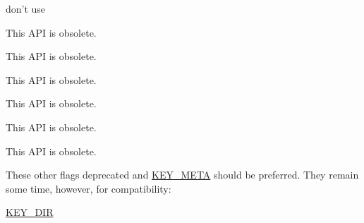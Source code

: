 
\begin{DoxyRefList}
\item[\label{deprecated__deprecated000001}%
\hypertarget{deprecated__deprecated000001}{}%
Global \hyperlink{group__keyset_gga98a3d6a4016c9dad9cbd1a99a9c2a45aad9d03b36ee88ca5a774cc01b190c99b8}{K\-D\-B\-\_\-\-O\-\_\-\-S\-O\-R\-T} ]don't use  
\item[\label{deprecated__deprecated000010}%
\hypertarget{deprecated__deprecated000010}{}%
Global \hyperlink{group__keymeta_ga6b05da399c3c78904969ef39f191b0eb}{key\-Get\-A\-Time} (const Key $\ast$key)]This A\-P\-I is obsolete. 
\item[\label{deprecated__deprecated000014}%
\hypertarget{deprecated__deprecated000014}{}%
Global \hyperlink{group__keymeta_ga2c213c120cbe02201278ef7fb8cd94be}{key\-Get\-C\-Time} (const Key $\ast$key)]This A\-P\-I is obsolete. 
\item[\label{deprecated__deprecated000005}%
\hypertarget{deprecated__deprecated000005}{}%
Global \hyperlink{group__keymeta_ga46a95e81d7d7f4e3eb59e60e5f3738c0}{key\-Get\-G\-I\-D} (const Key $\ast$key)]This A\-P\-I is obsolete. 
\item[\label{deprecated__deprecated000008}%
\hypertarget{deprecated__deprecated000008}{}%
Global \hyperlink{group__keymeta_gabc0cec592ce3b77e9bc33dbc8e8f6bdc}{key\-Get\-Mode} (const Key $\ast$key)]This A\-P\-I is obsolete. 
\item[\label{deprecated__deprecated000012}%
\hypertarget{deprecated__deprecated000012}{}%
Global \hyperlink{group__keymeta_ga57689eb5691679071463b777ae786ae9}{key\-Get\-M\-Time} (const Key $\ast$key)]This A\-P\-I is obsolete. 
\item[\label{deprecated__deprecated000003}%
\hypertarget{deprecated__deprecated000003}{}%
Global \hyperlink{group__keymeta_gacaa5060e67b03f50ae49a3620c54bc46}{key\-Get\-U\-I\-D} (const Key $\ast$key)]This A\-P\-I is obsolete. 
\item[\label{deprecated__deprecated000002}%
\hypertarget{deprecated__deprecated000002}{}%
Global \hyperlink{group__key_gad23c65b44bf48d773759e1f9a4d43b89}{key\-New} (const char $\ast$name,...)]These other flags deprecated and \hyperlink{group__key_gga91fb3178848bd682000958089abbaf40a040582834bb2d90049947d7ef74e87e2}{K\-E\-Y\-\_\-\-M\-E\-T\-A} should be preferred. They remain some time, however, for compatibility\-:
\begin{DoxyItemize}
\item \hyperlink{group__key_gga91fb3178848bd682000958089abbaf40a9e43e47c8a21478538e2d20e049981d5}{K\-E\-Y\-\_\-\-D\-I\-R} \par

\end{DoxyItemize}
\end{DoxyRefList}
